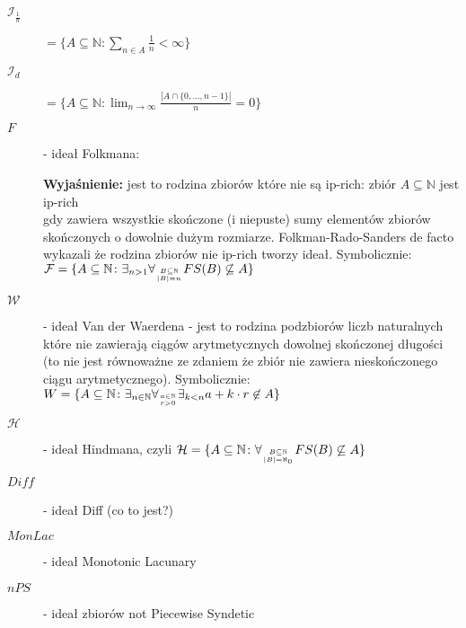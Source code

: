 \documentclass[12pt]{article}
\theoremstyle{plain}
\theoremstyle{definition}
\theoremstyle{remark}
\newcommand{\nnatural}{\mathbb{N}}
\begin{document}
\begin{description}
\item[$\mathcal{I}_{\frac{1}{n}}$] $= \lbrace A \subseteq \nnatural\colon
\sum_{n\in A} \frac{1}{n} < \infty\rbrace$

\item[$\mathcal{I}_{d}$] $= \lbrace A \subseteq \nnatural\colon
\lim_{n\to\infty} \frac{|A \cap \lbrace 0,\ldots, n-1\rbrace|}{n} = 0\rbrace$

\item[$\mathit{F}$] -  ideał Folkmana:

{\bf Wyjaśnienie:} jest to rodzina zbiorów które nie są ip-rich: zbiór $A\subseteq\nnatural$
jest ip-rich \\gdy zawiera 
wszystkie skończone (i niepuste) sumy 
elementów zbiorów skończonych o dowolnie dużym rozmiarze.
Folkman-Rado-Sanders de facto wykazali że rodzina zbiorów nie ip-rich 
tworzy ideał.
Symbolicznie: 
$\mathcal{F} = \lbrace A \subseteq \nnatural \colon \exists_{n > 1} 
\forall_{B \subseteq \nnatural \atop |B| = n} FS(B) \not \subseteq A \rbrace$ 
\item[$\mathcal{W}$] -  ideał Van der Waerdena - jest to rodzina
  podzbiorów liczb naturalnych które nie zawierają ciągów arytmetycznych
  dowolnej skończonej długości (to nie jest równoważne ze zdaniem
  że zbiór nie zawiera nieskończonego ciągu arytmetycznego).
  Symbolicznie: $W = \lbrace A \subseteq \nnatural \colon
  \exists_{n\in\nnatural} \forall_{a\in\nnatural \atop r > 0 }
  \exists_{k < n} a + k \cdot r \not\in A \rbrace$
\item[$\mathcal{H}$] -  ideał Hindmana, 
czyli $\mathcal{H} = \lbrace A \subseteq \nnatural \colon
\forall_{B \subseteq \nnatural \atop |B| = \aleph_0} 
FS(B) \not\subseteq A\rbrace$
\item[$\mathit{Diff}$] -  ideał Diff (co to jest?)
\item[$\mathit{MonLac}$] - ideał Monotonic Lacunary
\item[$\mathit{nPS}$] - ideał zbiorów not Piecewise Syndetic
\end{description}
\end{document}
